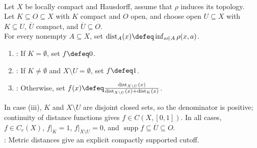 \begin{method} \label{meth:lch-metric-distance-cutoff} \\
Let $X$ be locally compact and Hausdorff, assume that $\rho$ induces its topology.\\
Let $K\subseteq O\subseteq X$ with $K$ compact and $O$ open, and choose open $U\subseteq X$ with $K\subseteq U$, $\overline{U}$ compact, and $\overline{U}\subseteq O$.\\
For every nonempty $A\subseteq X$, set $\operatorname{dist}_A(x)\defeq\inf_{a\in A}\rho(x,a)$.
\begin{enumerate}[label=(\roman*)]
\setlength{\itemsep}{0pt}
\item {}: If $K=\emptyset$, set $f\defeq0$.
\item {}: If $K\neq\emptyset$ and $X\setminus U=\emptyset$, set $f\defeq1$.
\item {}: Otherwise, set $f(x)\defeq\frac{\operatorname{dist}_{X\setminus U}(x)}{\operatorname{dist}_{X\setminus U}(x)+\operatorname{dist}_{K}(x)}$.
\end{enumerate}
In case (iii), $K$ and $X\setminus U$ are disjoint closed sets, so the denominator is positive; continuity of distance functions gives $f\in C(X,[0,1])$. In all cases, $f\in C_c(X)$, $f|_K=1$, $f|_{X\setminus U}=0$, and $\operatorname{supp}f\subseteq\overline{U}\subseteq O$.\\
: Metric distances give an explicit compactly supported cutoff.
\end{method}

